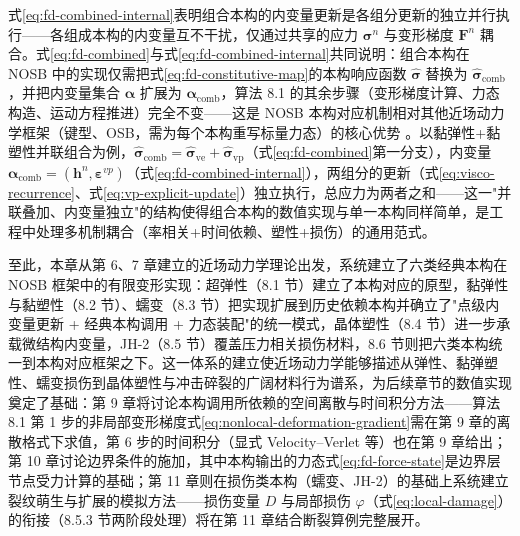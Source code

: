 式\eqref{eq:fd-combined-internal}表明组合本构的内变量更新是各组分更新的独立并行执行——各组成本构的内变量互不干扰，仅通过共享的应力 $\boldsymbol{\sigma}^{n}$ 与变形梯度 $\mathbf{F}^{n}$ 耦合。式\eqref{eq:fd-combined}与式\eqref{eq:fd-combined-internal}共同说明：组合本构在 NOSB 中的实现仅需把式\eqref{eq:fd-constitutive-map}的本构响应函数 $\hat{\boldsymbol{\sigma}}$ 替换为 $\hat{\boldsymbol{\sigma}}_{\mathrm{comb}}$，并把内变量集合 $\boldsymbol{\alpha}$ 扩展为 $\boldsymbol{\alpha}_{\mathrm{comb}}$，算法 8.1 的其余步骤（变形梯度计算、力态构造、运动方程推进）完全不变——这是 NOSB 本构对应机制相对其他近场动力学框架（键型、OSB，需为每个本构重写标量力态）的核心优势 \cite{Javili2019,Hashim2020}。以黏弹性+黏塑性并联组合为例，$\hat{\boldsymbol{\sigma}}_{\mathrm{comb}}=\hat{\boldsymbol{\sigma}}_{\mathrm{ve}}+\hat{\boldsymbol{\sigma}}_{\mathrm{vp}}$（式\eqref{eq:fd-combined}第一分支），内变量 $\boldsymbol{\alpha}_{\mathrm{comb}}=(\mathbf{h}^{n},\boldsymbol{\varepsilon}^{vp})$（式\eqref{eq:fd-combined-internal}），两组分的更新（式\eqref{eq:visco-recurrence}、式\eqref{eq:vp-explicit-update}）独立执行，总应力为两者之和——这一"并联叠加、内变量独立"的结构使得组合本构的数值实现与单一本构同样简单，是工程中处理多机制耦合（率相关+时间依赖、塑性+损伤）的通用范式。

至此，本章从第 6、7 章建立的近场动力学理论出发，系统建立了六类经典本构在 NOSB 框架中的有限变形实现：超弹性（8.1 节）建立了本构对应的原型，黏弹性与黏塑性（8.2 节）、蠕变（8.3 节）把实现扩展到历史依赖本构并确立了"点级内变量更新 + 经典本构调用 + 力态装配"的统一模式，晶体塑性（8.4 节）进一步承载微结构内变量，JH-2（8.5 节）覆盖压力相关损伤材料，8.6 节则把六类本构统一到本构对应框架之下。这一体系的建立使近场动力学能够描述从弹性、黏弹塑性、蠕变损伤到晶体塑性与冲击碎裂的广阔材料行为谱系，为后续章节的数值实现奠定了基础：第 9 章将讨论本构调用所依赖的空间离散与时间积分方法——算法 8.1 第 1 步的非局部变形梯度式\eqref{eq:nonlocal-deformation-gradient}需在第 9 章的离散格式下求值，第 6 步的时间积分（显式 Velocity--Verlet 等）也在第 9 章给出；第 10 章讨论边界条件的施加，其中本构输出的力态式\eqref{eq:fd-force-state}是边界层节点受力计算的基础；第 11 章则在损伤类本构（蠕变、JH-2）的基础上系统建立裂纹萌生与扩展的模拟方法——损伤变量 $D$ 与局部损伤 $\varphi$（式\eqref{eq:local-damage}）的衔接（8.5.3 节两阶段处理）将在第 11 章结合断裂算例完整展开。